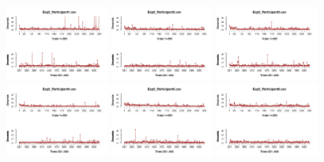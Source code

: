 \begin{figure}[th]
\centering
\includegraphics[width=0.30\textwidth]{Figures/RT2_Exp2_P1} \includegraphics[width=0.30\textwidth]{Figures/RT2_Exp2_P2} \includegraphics[width=0.30\textwidth]{Figures/RT2_Exp2_P3}
\includegraphics[width=0.30\textwidth]{Figures/RT2_Exp2_P4} \includegraphics[width=0.30\textwidth]{Figures/RT2_Exp2_P5} \includegraphics[width=0.30\textwidth]{Figures/RT2_Exp2_P6}

\end{figure}
